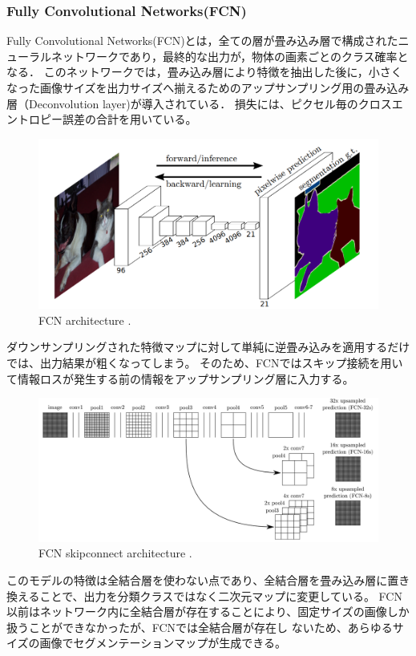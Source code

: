 \subsubsection{Fully Convolutional Networks(FCN)}
    Fully Convolutional Networks(FCN)とは，全ての層が畳み込み層で構成されたニューラルネットワークであり，最終的な出力が，物体の画素ごとのクラス確率となる．
    このネットワークでは，畳み込み層により特徴を抽出した後に，小さくなった画像サイズを出力サイズへ揃えるためのアップサンプリング用の畳み込み層（Deconvolution layer)が導入されている．
    損失には、ピクセル毎のクロスエントロピー誤差の合計を用いている。
    \begin{figure}[ht]
      \centering
      \includegraphics[width=12cm]{8_appendix/img/fcn}
      \caption{FCN architecture \cite{long2015fully}.}
    \end{figure}
    ダウンサンプリングされた特徴マップに対して単純に逆畳み込みを適用するだけでは、出力結果が粗くなってしまう。
    そのため、FCNではスキップ接続を用いて情報ロスが発生する前の情報をアップサンプリング層に入力する。
    \begin{figure}[ht]
      \centering
      \includegraphics[width=12cm]{8_appendix/img/FCNskipconnect}
      \caption{FCN skipconnect architecture \cite{ronneberger2015u}.}
    \end{figure}
    
    このモデルの特徴は全結合層を使わない点であり、全結合層を畳み込み層に置き換えることで、出力を分類クラスではなく二次元マップに変更している。
    FCN以前はネットワーク内に全結合層が存在することにより、固定サイズの画像しか扱うことができなかったが、FCNでは全結合層が存在し
    ないため、あらゆるサイズの画像でセグメンテーションマップが生成できる。

